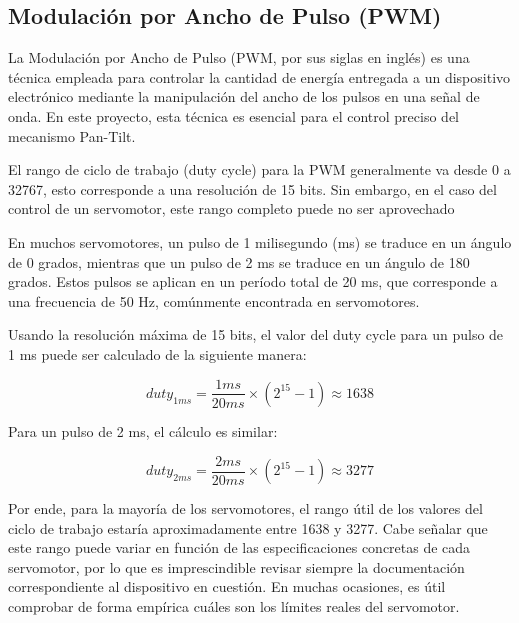 \subsection{Modulación por Ancho de Pulso (PWM)}
\label{subsection:pwm}

La Modulación por Ancho de Pulso (PWM, por sus siglas en inglés) es una técnica empleada para controlar la cantidad de energía entregada a un dispositivo electrónico mediante la manipulación del ancho de los pulsos en una señal de onda. En este proyecto, esta técnica es esencial para el control preciso del mecanismo Pan-Tilt.



El rango de ciclo de trabajo (duty cycle) para la PWM generalmente va desde 0 a 32767, esto corresponde a una resolución de 15 bits. Sin embargo, en el caso del control de un servomotor, este rango completo puede no ser aprovechado\cite{Espressif2023}



En muchos servomotores, un pulso de 1 milisegundo (ms) se traduce en un ángulo de 0 grados, mientras que un pulso de 2 ms se traduce en un ángulo de 180 grados. Estos pulsos se aplican en un período total de 20 ms, que corresponde a una frecuencia de 50 Hz, comúnmente encontrada en servomotores.



Usando la resolución máxima de 15 bits, el valor del duty cycle para un pulso de 1 ms puede ser calculado de la siguiente manera:

\[
duty_{1ms} = \frac{1ms}{20ms} \times (2^{15} - 1) \approx 1638
\]

Para un pulso de 2 ms, el cálculo es similar:

\[
duty_{2ms} = \frac{2ms}{20ms} \times (2^{15} - 1) \approx 3277
\]



Por ende, para la mayoría de los servomotores, el rango útil de los valores del ciclo de trabajo estaría aproximadamente entre 1638 y 3277. Cabe señalar que este rango puede variar en función de las especificaciones concretas de cada servomotor, por lo que es imprescindible revisar siempre la documentación correspondiente al dispositivo en cuestión. En muchas ocasiones, es útil comprobar de forma empírica cuáles son los límites reales del servomotor.